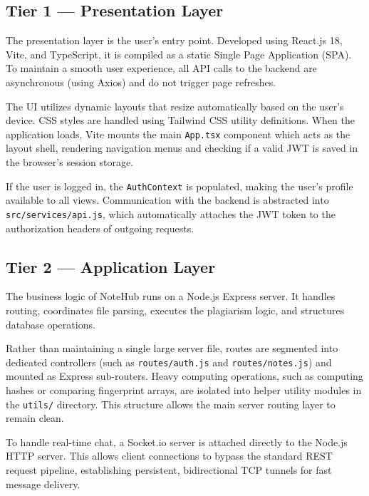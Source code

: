 \documentclass[12,Times new Roman,a4paper]{report}
\begin{document}
\subsection{Tier 1 — Presentation Layer}

The presentation layer is the user's entry point. Developed using React.js 18, Vite, and TypeScript, it is compiled as a static Single Page Application (SPA). To maintain a smooth user experience, all API calls to the backend are asynchronous (using Axios) and do not trigger page refreshes.

The UI utilizes dynamic layouts that resize automatically based on the user's device. CSS styles are handled using Tailwind CSS utility definitions. When the application loads, Vite mounts the main \texttt{App.tsx} component which acts as the layout shell, rendering navigation menus and checking if a valid JWT is saved in the browser's session storage.

If the user is logged in, the \texttt{AuthContext} is populated, making the user's profile available to all views. Communication with the backend is abstracted into \texttt{src/services/api.js}, which automatically attaches the JWT token to the authorization headers of outgoing requests.

\subsection{Tier 2 — Application Layer}

The business logic of NoteHub runs on a Node.js Express server. It handles routing, coordinates file parsing, executes the plagiarism logic, and structures database operations.

Rather than maintaining a single large server file, routes are segmented into dedicated controllers (such as \texttt{routes/auth.js} and \texttt{routes/notes.js}) and mounted as Express sub-routers. Heavy computing operations, such as computing hashes or comparing fingerprint arrays, are isolated into helper utility modules in the \texttt{utils/} directory. This structure allows the main server routing layer to remain clean.

To handle real-time chat, a Socket.io server is attached directly to the Node.js HTTP server. This allows client connections to bypass the standard REST request pipeline, establishing persistent, bidirectional TCP tunnels for fast message delivery.
\end{document}
